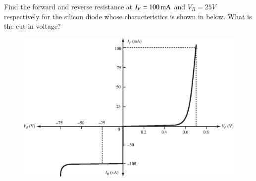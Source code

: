\begin{example}\label{exam1.1}
Find the forward and reverse resistance at $I_F = 100\operatorname{mA}$ and $V_R = 25
V$ respectively for the silicon diode whose characteristics is shown
in below. What is the cut-in voltage?
\begin{figure}[H]
\centering
\includegraphics{chap1/S3-EE-01-007.eps}
\end{figure}
\end{example}

\eject


